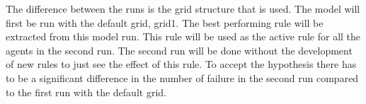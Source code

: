 \documentclass[a4paper]{article}
\begin{document}
The difference between the runs is the grid structure that is used. The model will first be run with the default grid, grid1.
The best performing rule will be extracted from this model run. This rule will be used as the active rule for all the 
agents in the second run. The second run will be done without the development of new rules  to just see the effect 
of this rule. 
To accept the hypothesis there has to be a significant difference in the number of failure in the second run compared 
to the first run with the default grid. 

\end{document}
